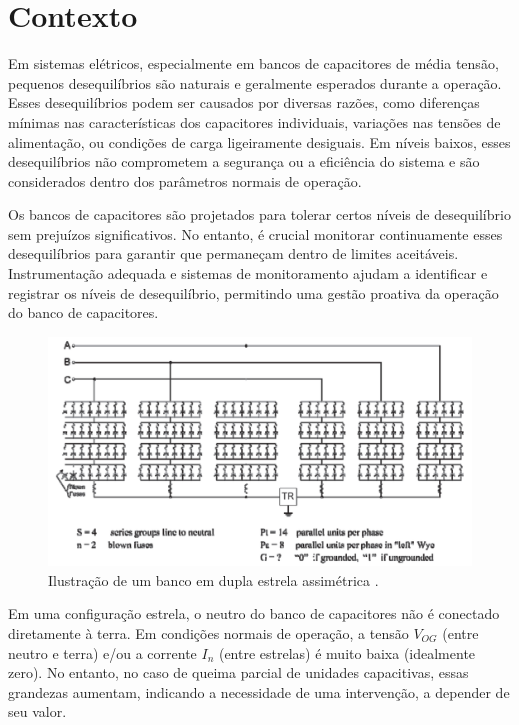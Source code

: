 \documentclass[a4paper]{article}
\begin{document}

\section{Contexto}
Em sistemas elétricos, especialmente em bancos de capacitores de média tensão, pequenos desequilíbrios são naturais e geralmente esperados durante a operação. Esses desequilíbrios podem ser causados por diversas razões, como diferenças mínimas nas características dos capacitores individuais, variações nas tensões de alimentação, ou condições de carga ligeiramente desiguais. Em níveis baixos, esses desequilíbrios não comprometem a segurança ou a eficiência do sistema e são considerados dentro dos parâmetros normais de operação.

Os bancos de capacitores são projetados para tolerar certos níveis de desequilíbrio sem prejuízos significativos. No entanto, é crucial monitorar continuamente esses desequilíbrios para garantir que permaneçam dentro de limites aceitáveis. Instrumentação adequada e sistemas de monitoramento ajudam a identificar e registrar os níveis de desequilíbrio, permitindo uma gestão proativa da operação do banco de capacitores.

\begin{figure}[htbp]
	\centering
	\includegraphics[width=0.9\linewidth]{"Figure 29 Illustration of a double wye-connected capacitor bank"}
	\caption{Ilustração de um banco em dupla estrela assimétrica \cite{ieeec3799}.}
	\label{fig:figure-34-illustration-of-an-uneven-double-wye-connected-bank}
\end{figure}

Em uma configuração estrela, o neutro do banco de capacitores não é conectado diretamente à terra. Em condições normais de operação, a tensão $V_{OG}$ (entre neutro e terra) e/ou a corrente $I_n$ (entre estrelas) é muito baixa (idealmente zero). No entanto, no caso de queima parcial de unidades capacitivas, essas grandezas aumentam, indicando a necessidade de uma intervenção, a depender de seu valor.
\end{document}
